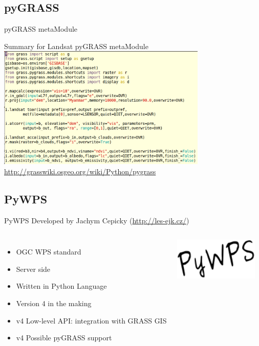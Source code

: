 \documentclass[aspectratio=169,unknownkeysallowed,xcolor=dvipsnames,beamer]{beamer} %
\begin{document}
\subsection{pyGRASS}
\begin{frame}[fragile]{pyGRASS metaModule}

\begin{center}
 Summary for Landsat pyGRASS metaModule
 \includegraphics[width=10cm]{pyGRASS1}\\
 \href{http://grasswiki.osgeo.org/wiki/Python/pygrass}{http://grasswiki.osgeo.org/wiki/Python/pygrass}
\end{center}

\end{frame}

\subsection{PyWPS}
\begin{frame}[fragile]{PyWPS}
 Developed by Jachym Cepicky (\href{http://les-ejk.cz/}{http://les-ejk.cz/})
\begin{columns}
 \begin{itemize}
  \item OGC WPS standard
  \item Server side
  \item Written in Python Language
  \item Version 4 in the making
  \item v4 Low-level API: integration with GRASS GIS
  \item v4 Possible pyGRASS support
 \end{itemize}

\begin{flushright}
  \includegraphics[width=4cm]{pywps}
\end{flushright}
\end{columns}
\hspace{10mm}
\end{frame}
\end{document}

